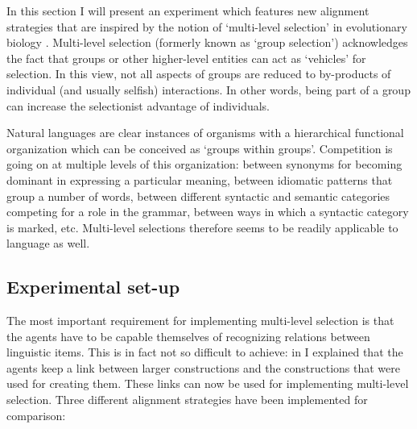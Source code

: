 In this section I will present an experiment which features new alignment strategies that are inspired by the notion of `multi-level selection' in evolutionary biology \citep{wilson94group}. Multi-level selection (formerly known as `group selection') acknowledges the fact that groups or other higher-level entities can act as `vehicles' for selection. In this view, not all aspects of groups are reduced to by-products of individual (and usually selfish) interactions. In other words, being part of a group can increase the selectionist advantage of individuals.%

Natural languages are clear instances of organisms with a hierarchical functional organization which can be conceived as `groups within groups'. Competition is going on at multiple levels of this organization: between synonyms for becoming dominant in expressing a particular meaning, between idiomatic patterns that group a number of words, between different syntactic and semantic categories competing for a role in the grammar, between ways in which a syntactic category is marked, etc. Multi-level selections therefore seems to be readily applicable to language as well.

\subsection{Experimental set-up}

The most important requirement for implementing multi-level selection is that the agents have to be capable themselves of recognizing relations between linguistic items. This is in fact not so difficult to achieve: in  I explained that the agents keep a link between larger constructions and the constructions that were used for creating them. These links can now be used for implementing multi-level selection. Three different alignment strategies have been implemented for comparison:

